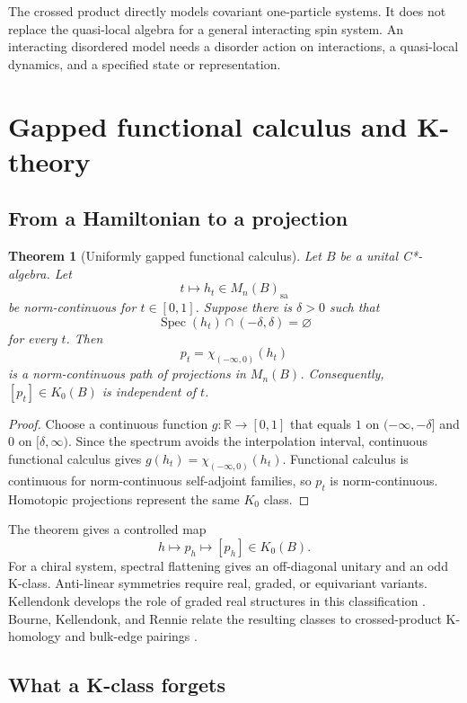 \documentclass[12pt]{article}
\newtheorem{theorem}{Theorem}[section]
\theoremstyle{definition}
\theoremstyle{remark}
\newcommand{\R}{\mathbb R}
\newcommand{\Spec}{\operatorname{Spec}}
\begin{document}
The crossed product directly models covariant one-particle systems.  It does not
replace the quasi-local algebra for a general interacting spin system.  An
interacting disordered model needs a disorder action on interactions, a quasi-local
dynamics, and a specified state or representation.

\section{Gapped functional calculus and K-theory}

\subsection{From a Hamiltonian to a projection}

\begin{theorem}[Uniformly gapped functional calculus]\label{thm:gapped-k}
Let $B$ be a unital C*-algebra.  Let
\[
t\longmapsto h_t\in M_n(B)_{\mathrm{sa}}
\]
be norm-continuous for $t\in[0,1]$.  Suppose there is $\delta>0$ such that
\[
\Spec(h_t)\cap(-\delta,\delta)=\varnothing
\]
for every $t$.  Then
\[
p_t=\chi_{(-\infty,0)}(h_t)
\]
is a norm-continuous path of projections in $M_n(B)$.  Consequently,
$[p_t]\in K_0(B)$ is independent of $t$.
\end{theorem}

\begin{proof}
Choose a continuous function $g:\R\to[0,1]$ that equals $1$ on
$(-\infty,-\delta]$ and $0$ on $[\delta,\infty)$.  Since the spectrum avoids the
interpolation interval, continuous functional calculus gives
$g(h_t)=\chi_{(-\infty,0)}(h_t)$.  Functional calculus is continuous for
norm-continuous self-adjoint families, so $p_t$ is norm-continuous.  Homotopic
projections represent the same $K_0$ class.
\end{proof}

The theorem gives a controlled map
\[
h\longmapsto p_h\longmapsto[p_h]\in K_0(B).
\]
For a chiral system, spectral flattening gives an off-diagonal unitary and an odd
K-class.  Anti-linear symmetries require real, graded, or equivariant variants.
Kellendonk develops the role of graded real structures in this classification
\cite{Kellendonk}.  Bourne, Kellendonk, and Rennie relate the resulting classes to
crossed-product K-homology and bulk-edge pairings
\cite{BourneKellendonkRennie}.

\subsection{What a K-class forgets}
\end{document}
